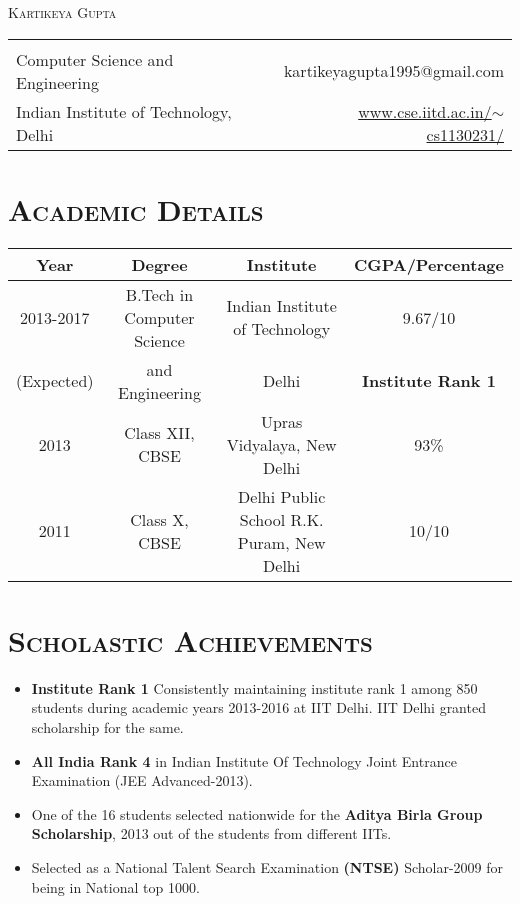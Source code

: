 \documentclass{article}
\newcommand{\tmpsection}[1]{}
\let\tmpsection=\section
\renewcommand{\section}[1]{\tmpsection*{\textsc{#1}}}
\begin{document}
\begin{center}
 {\large \textsc{Kartikeya Gupta} }\\ 
\begin{tabular}{ l p{4cm} r }
    & &   \\
  Computer Science and Engineering & & kartikeyagupta1995@gmail.com \\
  Indian Institute of Technology, Delhi & & \href{http://www.cse.iitd.ac.in/~cs1130231/}{www.cse.iitd.ac.in/$\sim$cs1130231/} \\
\end{tabular}
\end{center}


\section{Academic Details}
\begin{center}
\begin{tabular}{ |c | c | c | c |}
\hline
Year & Degree & Institute & CGPA/Percentage \\ 
\hline
2013-2017 & B.Tech in Computer Science & Indian Institute of Technology & 9.67/10 \\ 
(Expected) & and Engineering & Delhi & \textbf{Institute Rank 1} \\ 
\hline
2013 & Class XII, CBSE & Upras Vidyalaya, New Delhi & 93\% \\ 
\hline
2011 & Class X, CBSE & Delhi Public School R.K. Puram,  New Delhi & 10/10 \\  \hline
\end{tabular}
\end{center}

\section{Scholastic Achievements}
\begin{itemize}
    \setlength\itemsep{0em}
    \item \textbf{Institute Rank 1}  Consistently maintaining institute rank 1 among 850 students during academic years 2013-2016 at IIT Delhi. IIT Delhi granted scholarship for the same.  
    \item \textbf{All India Rank 4} in Indian Institute Of Technology Joint Entrance Examination (JEE Advanced-2013).
    \item One of the 16 students selected nationwide for the \textbf{Aditya Birla Group Scholarship}, 2013 out of the students from different IITs.
    \item Selected as a National Talent Search Examination\textbf{ (NTSE)}  Scholar-2009 for being in National top 1000.
\end{itemize}
\end{document}

